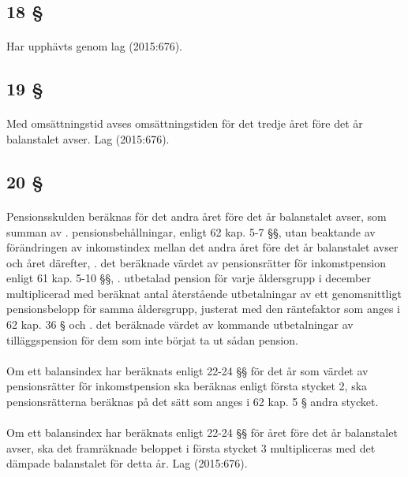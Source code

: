 \documentclass[a4paper,notitlepage,openany,10pt]{book}
\begin{document}
\subsection*{18 §}
\paragraph*{}
Har upphävts genom
lag (2015:676).
\subsection*{19 §}
\paragraph*{}
Med omsättningstid avses omsättningstiden för det tredje året före det år balanstalet avser.
Lag (2015:676).
\subsection*{20 §}
\paragraph*{}
Pensionsskulden beräknas för det andra året före det år balanstalet avser, som summan av
. pensionsbehållningar, enligt 62 kap. 5-7 §§, utan beaktande av förändringen av inkomstindex mellan det andra året före det år balanstalet avser och året därefter,
. det beräknade värdet av pensionsrätter för inkomstpension enligt 61 kap. 5-10 §§,
. utbetalad pension för varje åldersgrupp i december multiplicerad med beräknat antal återstående utbetalningar av ett genomsnittligt pensionsbelopp för samma åldersgrupp, justerat med den räntefaktor som anges i 62 kap. 36 § och
. det beräknade värdet av kommande utbetalningar av tilläggspension för dem som inte börjat ta ut sådan pension.
\paragraph*{}
Om ett balansindex har beräknats enligt 22-24 §§ för det år som värdet av pensionsrätter för inkomstpension ska beräknas enligt första stycket 2, ska pensionsrätterna beräknas på det sätt som anges i 62 kap. 5 § andra stycket.
\paragraph*{}
Om ett balansindex har beräknats enligt 22-24 §§ för året före det år balanstalet avser, ska det framräknade beloppet i första stycket 3 multipliceras med det dämpade balanstalet för detta år.
Lag (2015:676).
\end{document}
